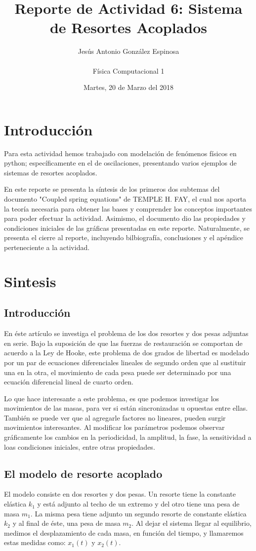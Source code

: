 \documentclass[a4paper]{article}
\title{Reporte de Actividad 6: Sistema de Resortes Acoplados}
\author{Jesús Antonio González Espinosa \\ \\ Física Computacional 1}
\date{Martes, 20 de Marzo del 2018}
\begin{document}
\maketitle

\section{Introducción}

Para esta actividad hemos trabajado con modelación de fenómenos físicos en python; específicamente en el de oscilaciones, presentando varios ejemplos de sistemas de resortes acoplados.

En este reporte se presenta la síntesis de los primeros dos subtemas del documento "Coupled spring equations" de TEMPLE H. FAY, el cual nos aporta la teoría necesaria para obtener las bases y comprender los conceptos importantes para poder efectuar la actividad. Asimismo, el documento dio las propiedades y condiciones iniciales de las gráficas presentadas en este reporte. Naturalmente, se presenta el cierre al reporte, incluyendo bilbiografía, conclusiones y el apéndice perteneciente a la actividad.

\section{Sintesis}
\subsection{Introducción}
En éste artículo se investiga el problema de los dos resortes y dos pesas adjuntas en serie. Bajo la suposición de que las fuerzas de restauración se comportan de acuerdo a la Ley de Hooke, este problema de dos grados de libertad es modelado por un par de ecuaciones diferenciales lineales de segundo orden que al sustituir una en la otra, el movimiento de cada pesa puede ser determinado por una ecuación diferencial lineal de cuarto orden. 

Lo que hace interesante a este problema, es que podemos investigar los movimientos de las masas, para ver si están sincronizadas u opuestas entre ellas. También se puede ver que al agregarle factores no lineares, pueden surgir movimientos interesantes. Al modificar los parámetros podemos observar gráficamente los cambios en la periodicidad, la amplitud, la fase, la sensitividad a loas condiciones iniciales, entre otras propiedades. 

\subsection{El modelo de resorte acoplado}
El modelo consiste en dos resortes y dos pesas. Un resorte tiene la constante elástica $k_1$ y está adjunto al techo de un extremo y del otro tiene una pesa de masa $m_1$. La misma pesa tiene adjunto un segundo resorte de constante elástica $k_2$ y al final de éste, una pesa de masa $m_2$. Al dejar el sistema llegar al equilibrio, medimos el desplazamiento de cada masa, en función del tiempo, y llamaremos estas medidas como: $x_1(t)$ y $x_2(t)$.
\end{document}
